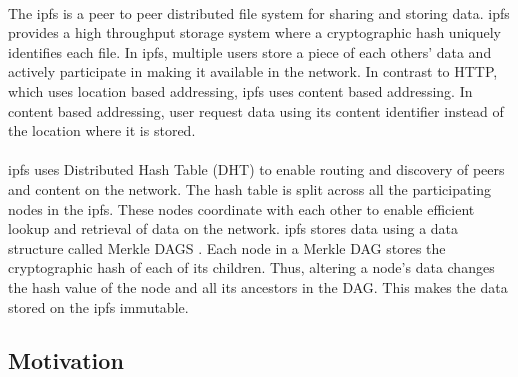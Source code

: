 \documentclass[12pt]{article}
\begin{document}
        \paragraph{}
        The \acrfull{ipfs} \cite{IPFS} is a peer to peer distributed file system for sharing and storing data. \acrshort{ipfs} provides a high throughput storage system where a cryptographic hash uniquely identifies each file. In \acrshort{ipfs}, multiple users store a piece of each others' data and actively participate in making it available in the network. In contrast to HTTP, which uses location based addressing, \acrshort{ipfs} uses content based addressing. In content based addressing, user request data using its content identifier instead of the location where it is stored.

        \paragraph{}
        \acrshort{ipfs} uses Distributed Hash Table (DHT) \cite{DHT} to enable routing and discovery of peers and content on the network. The hash table is split across all the participating nodes in the \acrshort{ipfs}. These nodes coordinate with each other to enable efficient lookup and retrieval of data on the network. \acrshort{ipfs} stores data using a data structure called Merkle DAGS \cite{IPFS}. Each node in a Merkle DAG stores the cryptographic hash of each of its children. Thus, altering a node's data changes the hash value of the node and all its ancestors in the DAG. This makes the data stored on the \acrshort{ipfs} immutable.
        
    \subsection{Motivation}
\end{document}
